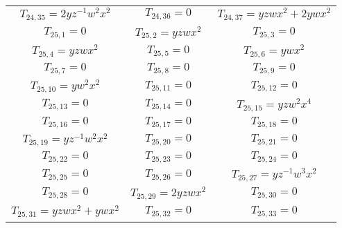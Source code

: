 \begin{longtable}{|c|c|c|}
$T_{24,35}= 2yz^{-1}w^2x^2$&

$T_{24,36}= 0$&

$T_{24,37}= yzwx^2+2ywx^2$\\

$T_{25,1}= 0$&

$T_{25,2}= yzwx^2$&

$T_{25,3}= 0$\\

$T_{25,4}= yzwx^2$&

$T_{25,5}= 0$&

$T_{25,6}= ywx^2$\\

$T_{25,7}= 0$&

$T_{25,8}= 0$&

$T_{25,9}= 0$\\

$T_{25,10}= yw^2x^2$&

$T_{25,11}= 0$&

$T_{25,12}= 0$\\

$T_{25,13}= 0$&

$T_{25,14}= 0$&

$T_{25,15}= yzw^2x^4$\\

$T_{25,16}= 0$&

$T_{25,17}= 0$&

$T_{25,18}= 0$\\

$T_{25,19}= yz^{-1}w^2x^2$&

$T_{25,20}= 0$&

$T_{25,21}= 0$\\

$T_{25,22}= 0$&

$T_{25,23}= 0$&

$T_{25,24}= 0$\\

$T_{25,25}= 0$&

$T_{25,26}= 0$&

$T_{25,27}= yz^{-1}w^3x^2$\\

$T_{25,28}= 0$&

$T_{25,29}= 2yzwx^2$&

$T_{25,30}= 0$\\

$T_{25,31}= yzwx^2+ywx^2$&

$T_{25,32}= 0$&

$T_{25,33}= 0$\\


\end{longtable}
